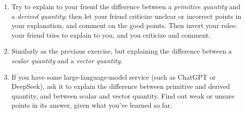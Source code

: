 \documentclass[a4paper,12pt,%
onecolumn,oneside,%
british%
]{memoir}
\renewcommand*{\|}[1][]{\nonscript\:#1\vert\nonscript\:\mathopen{}}
\begin{document}
\smallskip

\begin{enumerate}[exerc]
\item Try to explain to your friend the difference between a \emph{primitive quantity} and a \emph{derived quantity}; then let your friend criticize unclear or incorrect points in your explanation, and comment on the good points. Then invert your roles: your friend tries to explain to you, and you criticize and comment.

\item Similarly as the previous exercise, but explaining the difference between a \emph{scalar quantity} and a \emph{vector quantity}.

\item If you have some large-language-model service (such as ChatGPT or DeepSeek), ask it to explain the difference between primitive and derived quantity, and between scalar and vector quantity. Find out weak or unsure points in its answer, given what you've learned so far.
\end{enumerate}

\section{}
\label{sec:units_functions}
\end{document}

